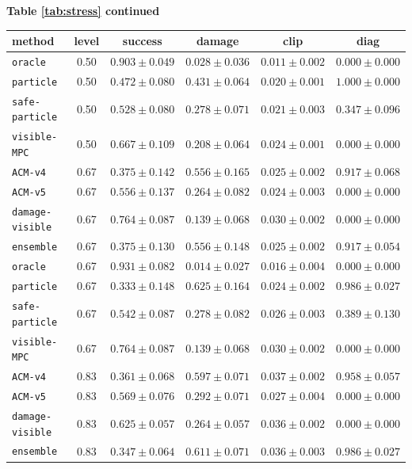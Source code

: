 \documentclass{article}
\begin{document}
\begin{center}
\textbf{Table \ref{tab:stress} continued}\\[0.4ex]
\begin{tabular}{lccccc}
\toprule
method & level & success & damage & clip & diag \\
\midrule
\texttt{oracle} & 0.50 & $0.903 \pm 0.049$ & $0.028 \pm 0.036$ & $0.011 \pm 0.002$ & $0.000 \pm 0.000$ \\
\texttt{particle} & 0.50 & $0.472 \pm 0.080$ & $0.431 \pm 0.064$ & $0.020 \pm 0.001$ & $1.000 \pm 0.000$ \\
\texttt{safe-particle} & 0.50 & $0.528 \pm 0.080$ & $0.278 \pm 0.071$ & $0.021 \pm 0.003$ & $0.347 \pm 0.096$ \\
\texttt{visible-MPC} & 0.50 & $0.667 \pm 0.109$ & $0.208 \pm 0.064$ & $0.024 \pm 0.001$ & $0.000 \pm 0.000$ \\
\texttt{ACM-v4} & 0.67 & $0.375 \pm 0.142$ & $0.556 \pm 0.165$ & $0.025 \pm 0.002$ & $0.917 \pm 0.068$ \\
\texttt{ACM-v5} & 0.67 & $0.556 \pm 0.137$ & $0.264 \pm 0.082$ & $0.024 \pm 0.003$ & $0.000 \pm 0.000$ \\
\texttt{damage-visible} & 0.67 & $0.764 \pm 0.087$ & $0.139 \pm 0.068$ & $0.030 \pm 0.002$ & $0.000 \pm 0.000$ \\
\texttt{ensemble} & 0.67 & $0.375 \pm 0.130$ & $0.556 \pm 0.148$ & $0.025 \pm 0.002$ & $0.917 \pm 0.054$ \\
\texttt{oracle} & 0.67 & $0.931 \pm 0.082$ & $0.014 \pm 0.027$ & $0.016 \pm 0.004$ & $0.000 \pm 0.000$ \\
\texttt{particle} & 0.67 & $0.333 \pm 0.148$ & $0.625 \pm 0.164$ & $0.024 \pm 0.002$ & $0.986 \pm 0.027$ \\
\texttt{safe-particle} & 0.67 & $0.542 \pm 0.087$ & $0.278 \pm 0.082$ & $0.026 \pm 0.003$ & $0.389 \pm 0.130$ \\
\texttt{visible-MPC} & 0.67 & $0.764 \pm 0.087$ & $0.139 \pm 0.068$ & $0.030 \pm 0.002$ & $0.000 \pm 0.000$ \\
\texttt{ACM-v4} & 0.83 & $0.361 \pm 0.068$ & $0.597 \pm 0.071$ & $0.037 \pm 0.002$ & $0.958 \pm 0.057$ \\
\texttt{ACM-v5} & 0.83 & $0.569 \pm 0.076$ & $0.292 \pm 0.071$ & $0.027 \pm 0.004$ & $0.000 \pm 0.000$ \\
\texttt{damage-visible} & 0.83 & $0.625 \pm 0.057$ & $0.264 \pm 0.057$ & $0.036 \pm 0.002$ & $0.000 \pm 0.000$ \\
\texttt{ensemble} & 0.83 & $0.347 \pm 0.064$ & $0.611 \pm 0.071$ & $0.036 \pm 0.003$ & $0.986 \pm 0.027$ \\

\end{tabular}
\end{center}
\end{document}

